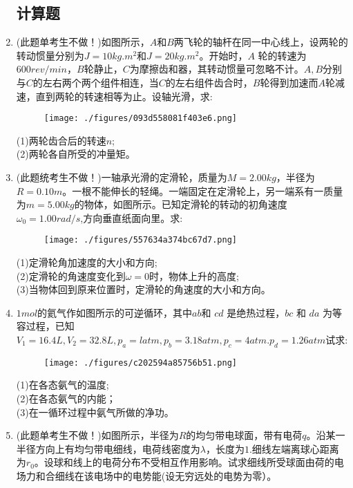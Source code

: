 \begin{enumerate}
\subsection{计算题}
\item (此题单考生不做！)如图所示，$A$和$B$两飞轮的轴杆在同一中心线上，设两轮的转动惯量分别为$J=10kg.m^2$和$J=20kg.m^2$。开始时，$A$ 轮的转速为 $600rev/min$，$B$轮静止，$C$为摩擦齿和器，其转动惯量可忽略不计。$A,B$分别与$C$的左右两个两个组件相连，当$C$的左右组件齿合时，$B$轮得到加速而$A$轮减速，直到两轮的转速相等为止。设轴光滑，求:\\
\begin{figure}[ht]
\centering
\texttt{[image: ./figures/093d558081f403e6.png]}
\caption{} \label{fig_BKDP06_7}
\end{figure}
(1)两轮齿合后的转速$n$;\\
(2)两轮各自所受的冲量矩。
\item (此题统考生不做！)一轴承光滑的定滑轮，质量为$M=2.00kg$，半径为$ R=0.10m$。一根不能伸长的轻绳。一端固定在定滑轮上，另一端系有一质量为$m=5.00kg $的物体，如图所示。已知定滑轮的转动的初角速度 $\omega_0=1.00 rad/s$,方向垂直纸面向里。求:\\
\begin{figure}[ht]
\centering
\texttt{[image: ./figures/557634a374bc67d7.png]}
\caption{} \label{fig_BKDP06_6}
\end{figure}
(1)定滑轮角加速度的大小和方向;\\
(2)定滑轮的角速度变化到$\omega=0$时，物体上升的高度;\\
(3)当物体回到原来位置时，定滑轮的角速度的大小和方向。
\item $1 mol $的氦气作如图所示的可逆循环，其中$ ab $和 $cd$ 是绝热过程，$bc$ 和 $da$ 为等容过程，已知$V_1=16.4L,V_2=32.8L,p_a=l atm,p_b=3.18 atm,p_c=4 atm. p_d=1.26 atm $试求:\\
\begin{figure}[ht]
\centering
\texttt{[image: ./figures/c202594a85756b51.png]}
\caption{} \label{fig_BKDP06_5}
\end{figure}
(1)在各态氨气的温度;\\
(2)在各态氨气的内能；\\
(3)在一循环过程中氨气所做的净功。
\item (此题单考生不做！)如图所示，半径为$R$的均匀带电球面，带有电荷$q$。沿某一半径方向上有均匀带电细线，电荷线密度为$\lambda$，长度为$1$.细线左端离球心距离为$r_0$。设球和线上的电荷分布不受相互作用影响。试求细线所受球面由荷的电场力和合细线在该电场中的电势能(设无穷远处的电势为零）。

\end{enumerate}

